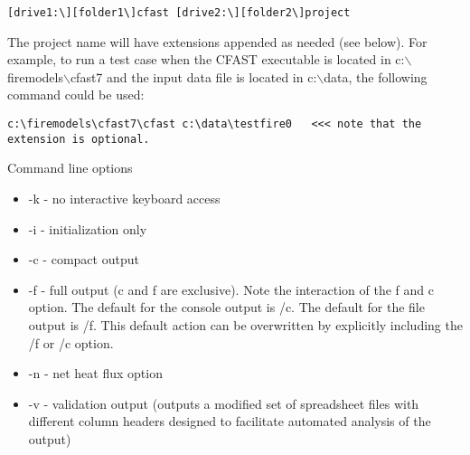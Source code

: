 \begin{lstlisting}
[drive1:\][folder1\]cfast [drive2:\][folder2\]project
\end{lstlisting}

The project name will have extensions appended as needed (see below). For example, to run a test case when the CFAST executable is located in c:$\backslash$firemodels$\backslash$cfast7 and the input data file is located in c:$\backslash$data, the following command could be used:

\begin{lstlisting}
c:\firemodels\cfast7\cfast c:\data\testfire0   <<< note that the extension is optional.
\end{lstlisting}

Command line options

\begin{itemize}
\item -k - no interactive keyboard access
\item -i - initialization only
\item -c - compact output
\item -f - full output (c and f are exclusive). Note the interaction of the f and c option. The default for the console output is /c. The default for the file output is /f. This default action can be overwritten by explicitly including the /f or /c option.
\item -n - net heat flux option
\item -v - validation output (outputs a modified set of spreadsheet files with different column headers designed to facilitate automated analysis of the output)
\end{itemize}


\label{last_page}
